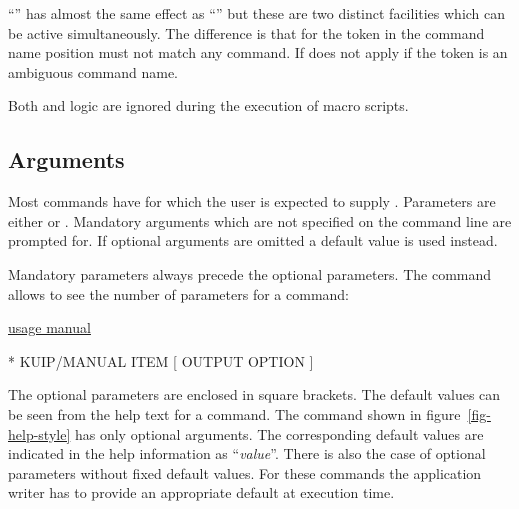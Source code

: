 ``'' has almost the same effect as 
``'' but these are two distinct facilities
which can be active simultaneously.
The difference is that for  the token in the command
name position must not match any command.
If does not apply if the token is an ambiguous command name.

Both  and  logic are ignored
during the execution of macro scripts.


%
%
\subsection{Arguments}

Most commands have  for which the user is expected to
supply .
Parameters are either  or .
Mandatory arguments which are not specified on the command line are
prompted for.
If optional arguments are omitted a default value is used instead.

Mandatory parameters always precede the optional parameters.
The command  allows to see the number of parameters for a command:
\begin{XMP}
\PROMPT{} \underline{usage manual}

 * KUIP/MANUAL ITEM [ OUTPUT OPTION ]
\end{XMP}
The optional parameters are enclosed in square brackets.
The default values can be seen from the help text for a command.
The  command shown in figure~\ref{fig-help-style} has only
optional arguments.
The corresponding default values are indicated in the help information
as ``\textsl{value}''.
There is also the case of optional parameters without fixed default values.
For these commands the application writer has to provide an
appropriate default at execution time.

